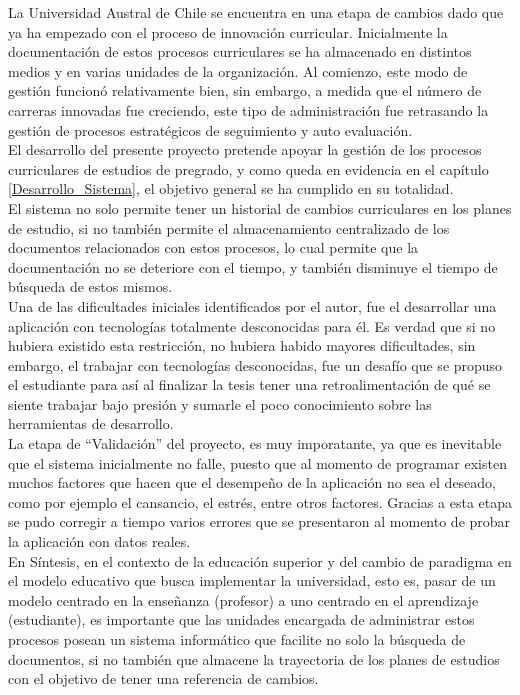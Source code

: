 La Universidad Austral de Chile se encuentra en una etapa de cambios dado que ya ha empezado con
el proceso de innovación curricular.  Inicialmente la documentación de estos procesos curriculares  se ha almacenado en distintos medios y en varias unidades de la organización. Al comienzo, este modo de gestión  funcionó relativamente bien, sin embargo, a  medida que el número de carreras innovadas fue creciendo,  este tipo de administración  fue retrasando la gestión de procesos estratégicos de seguimiento y auto evaluación.
\\


El desarrollo del presente proyecto  pretende apoyar la gestión de los procesos curriculares de estudios de pregrado, y como queda en evidencia en el  capítulo \ref{Desarrollo_Sistema}, el objetivo general se ha cumplido en su totalidad.
\\

El sistema no solo permite tener un historial de cambios curriculares en los planes de estudio, si no también permite el almacenamiento centralizado de los documentos relacionados con estos procesos, lo cual permite  que la documentación no se deteriore con el tiempo, y también disminuye el tiempo de búsqueda de estos mismos.\\

Una de las dificultades iniciales identificados por el autor, fue el desarrollar una aplicación con tecnologías totalmente desconocidas para él. Es verdad que si no hubiera existido esta restricción, no hubiera habido mayores dificultades, sin embargo, el trabajar con tecnologías desconocidas, fue un desafío que se propuso el estudiante para así al finalizar la tesis tener una retroalimentación de qué se siente trabajar bajo presión y sumarle el poco conocimiento sobre las herramientas de desarrollo.
\\ 


La  etapa de ``Validación'' del proyecto, es muy imporatante, ya que es inevitable que el sistema inicialmente no falle, puesto que al momento de programar existen muchos factores que hacen que el desempeño de la aplicación no sea el deseado, como por ejemplo  el cansancio, el estrés, entre otros factores. Gracias a esta etapa se pudo corregir a tiempo varios errores que se presentaron al momento de  probar la aplicación con datos reales.
\\



En Síntesis, en el contexto de la educación superior y del cambio de paradigma en el modelo educativo que busca implementar la universidad, esto es, pasar de un modelo centrado en la enseñanza (profesor) a uno centrado en el aprendizaje (estudiante), es importante que las unidades encargada de administrar estos procesos posean un sistema informático que facilite no solo la búsqueda de documentos, si no también  que almacene la trayectoria de los planes de estudios con el objetivo de tener una referencia de cambios.




